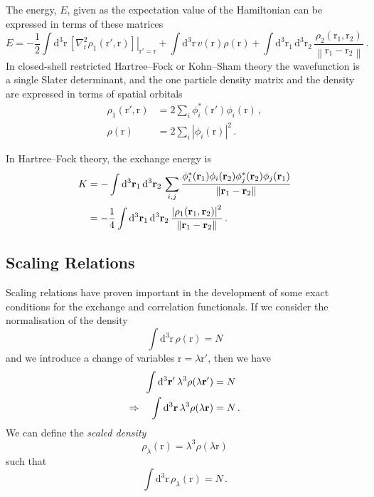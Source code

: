 \documentclass{article}
\theoremstyle{plain}\theoremheaderfont{\normalfont\itshape}\theorembodyfont{\rmfamily}\theoremseparator{.}\newtheorem*{rem}{Remark}\newtheorem*{ex}{Example}\newtheorem*{proof}{Proof}\newtheorem*{altp}{Alternative proof}
\theoremstyle{plain}\theoremheaderfont{\normalfont\bfseries}\theorembodyfont{\rmfamily}\theoremseparator{.}\newtheorem{thm}{Theorem}[section]\newtheorem{lem}[thm]{Lemma}\newtheorem{prop}[thm]{Proposition}\newtheorem*{cor}{Corollary}\newtheorem{defn}[thm]{Definition}\newtheorem{clm}[thm]{Claim}\newtheorem{clminproof}{Claim}
\theoremstyle{break}\theoremheaderfont{\normalfont\itshape}\theorembodyfont{\rmfamily}\theoremseparator{.\medskip}\newtheorem*{proofskip}{Proof}\newtheorem*{exs}{Examples}\newtheorem*{rems}{Remarks}
\theoremstyle{break}\theoremheaderfont{\normalfont\bfseries}\theorembodyfont{\rmfamily}\theoremseparator{.\medskip}\newtheorem{lemskip}[thm]{Lemma}\newtheorem{defnskip}[thm]{Definition}\newtheorem{propskip}[thm]{Proposition}\newtheorem{thmskip}[thm]{Theorem}
\numberwithin{equation}{section}
\newcommand{\dd}[2][]{\mathrm{d}^{#1} #2\,}
\newcommand{\vb}[1]{\bm{\mathrm{#1}}}
\newcommand{\abs}[1]{\left| #1 \right|}
\newcommand{\norm}[1]{\left\| #1 \right\|}
\newcommand{\laplacian}{\nabla^2}
\begin{document}
    The energy, \(E\), given as the expectation value of the Hamiltonian can be expressed in terms of these matrices
    \begin{equation}
        E=-\frac{1}{2}\int\dd[3]{\vb{r}}\left.[\laplacian_{\vb{r}}\rho_1(\vb{r}',\vb{r})]\right|_{\vb{r}'=\vb{r}}+\int\dd[3]{\vb{r}}v(\vb{r})\rho(\vb{r})+\int\dd[3]{\vb{r}_1}\dd[3]{\vb{r}_2}\frac{\rho_2(\vb{r}_1,\vb{r}_2)}{\norm{\vb{r}_1-\vb{r}_2}}\,.
    \end{equation}
    In closed-shell restricted Hartree--Fock or Kohn--Sham theory the wavefunction is a single Slater determinant, and the one particle density matrix and the density are expressed in terms of spatial orbitals
    \begin{align}
        \rho_1(\vb{r}',\vb{r})&=2\sum_i\phi_i^*(\vb{r}')\phi_i(\vb{r})\,,\\
        \rho(\vb{r})&=2\sum_i\abs{\phi_i(\vb{r})}^2\,.
    \end{align}

    In Hartree--Fock theory, the exchange energy is
    \begin{align}
        K&=-\int\dd[3]{\vb{r}_1}\dd[3]{\vb{r}_2}\sum_{i,j}\frac{\phi_i^*(\vb{r}_1)\phi_i(\vb{r}_2)\phi_j^*(\vb{r}_2)\phi_j(\vb{r}_1)}{\norm{\vb{r}_1-\vb{r}_2}}\notag\\
        &=-\frac{1}{4}\int\dd[3]{\vb{r}_1}\dd[3]{\vb{r}_2}\frac{\abs{\rho_1(\vb{r}_1,\vb{r}_2)}^2}{\norm{\vb{r}_1-\vb{r}_2}}\,.
    \end{align}
    \subsection{Scaling Relations}
    Scaling relations have proven important in the development of some exact conditions for the exchange and correlation functionals. If we consider the normalisation of the density
    \begin{equation}
        \int\dd[3]{\vb{r}}\rho(\vb{r})=N
    \end{equation}
    and we introduce a change of variables \(\vb{r}=\lambda\vb{r'}\), then we have
    \begin{align}
        \int\dd[3]{\vb{r}'}\lambda^3\rho(\lambda\vb{r}')&=N\notag\\
        \Rightarrow\quad\int\dd[3]{\vb{r}}\lambda^3\rho(\lambda\vb{r})&=N\,.
    \end{align}
    We can define the \textit{scaled density}
    \begin{equation}
        \rho_{\lambda}(\vb{r})=\lambda^3\rho(\lambda\vb{r})
    \end{equation}
    such that
    \begin{equation}
        \int\dd[3]{\vb{r}}\rho_\lambda(\vb{r})=N\,.
    \end{equation}
\end{document}
